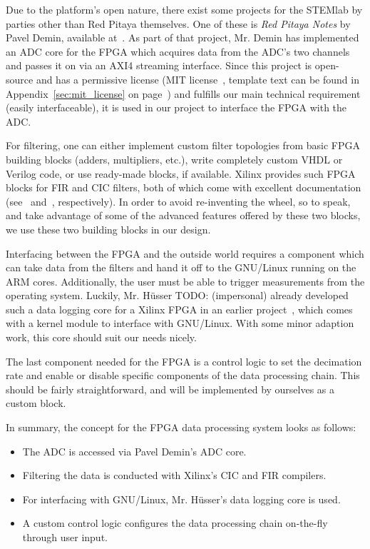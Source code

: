 Due to the  platform's open nature, there exist some  projects for the STEMlab
by parties other than Red Pitaya  themselves. One of these is \emph{Red Pitaya
Notes} by  Pavel Demin, available  at~\cite{pita:github:pitaya-notes}. As part
of that  project, Mr. Demin  has implemented  an ADC core  for the  FPGA which
acquires  data from  the ADC's  two  channels and  passes  it on  via an  AXI4
streaming interface\footnotemark.
Since   this   project  is   open-source   and   has  a   permissive   license
(MIT   license~\cite{licenses:mit},   template   text    can   be   found   in
Appendix~\ref{sec:mit_license} on page~\pageref{sec:mit_license}) and fulfills
our  main technical  requirement (easily  interfaceable),  it is  used in  our
project to interface the FPGA with the ADC.

For filtering,  one can either  implement custom filter topologies  from basic
FPGA building blocks (adders, multipliers, etc.), write completely custom VHDL
or Verilog code, or use ready-made blocks, if available.  Xilinx provides such
FPGA  blocks for  FIR  and CIC  filters,  both of  which  come with  excellent
documentation  (see~\cite{xilinx:cic-compiler} and~\cite{xilinx:fir-compiler},
respectively).  In  order to avoid  re-inventing the  wheel, so to  speak, and
take advantage of  some of the advanced features offered  by these two blocks,
we use these two building blocks in our design.

Interfacing  between the  FPGA  and  the outside  world  requires a  component
which  can take  data  from the  filters  and  hand it  off  to the  GNU/Linux
running  on the  ARM cores. Additionally,  the user  must be  able to  trigger
measurements   from  the   operating  system. Luckily,   Mr. H\"usser TODO: (impersonal) already
developed  such  a  data  logging  core  for  a  Xilinx  FPGA  in  an  earlier
project~\cite{pita:github:huesser:zynq-logger},  which  comes  with  a  kernel
module to interface  with GNU/Linux. With some minor adaption  work, this core
should suit our needs nicely.

The  last  component needed  for  the  FPGA is  a  control  logic to  set  the
decimation  rate  and  enable  or  disable specific  components  of  the  data
processing  chain. This  should  be   fairly  straightforward,  and   will  be
implemented by ourselves as a custom block.

In summary, the concept for the FPGA data processing system looks as follows:
\begin{itemize}\tightlist
    \item
        The ADC is accessed via Pavel Demin's ADC core.
    \item
        Filtering the data is conducted with Xilinx's CIC and FIR compilers.
    \item
        For interfacing  with GNU/Linux,  Mr. H\"usser's data logging  core is
        used.
    \item
        A custom control logic configures the data processing chain on-the-fly
        through user input.
\end{itemize}

